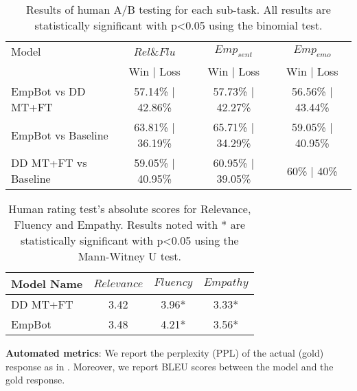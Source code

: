 \documentclass[11pt]{article}
\begin{document}
\begin{table*}[t]
\centering
\begin{tabular}{lccc}
\hline
Model &  ${Rel\&Flu}$ &  $Emp_{sent}$ & $Emp_{emo}$ \\
 &  Win | Loss & Win | Loss & Win | Loss \\
\hline
EmpBot vs DD MT+FT & 57.14\% | 42.86\%   &  57.73\% | 42.27\%  &  56.56\% | 43.44\%   \\  
EmpBot  vs Baseline & 63.81\% | 36.19\%  & 65.71\% | 34.29\%   & 59.05\% | 40.95\%   \\
DD MT+FT vs Baseline & 59.05\% | 40.95\%   &  60.95\% | 39.05\%   & 60\% | 40\%     \\
\hline
\end{tabular}
\caption{Results of human A/B testing for each sub-task. All results are statistically significant with p<0.05 using the binomial test.}
\label{tab:pairwise_dod_t5sent}
\end{table*}

\begin{table}[t]
\centering
\begin{adjustbox}{width=\columnwidth,center}
\begin{tabular}{lccc}
\hline
Model Name &  $Relevance$ & $Fluency$ & $Empathy$ \\
\hline
DD MT+FT & 3.42  &  3.96* & 3.33* \\  
EmpBot  &  3.48 & 4.21*  & 3.56* \\\hline
\end{tabular}
\end{adjustbox}
\caption{Human rating test's absolute scores for Relevance, Fluency and Empathy. Results noted with * are statistically significant with p<0.05 using the Mann-Witney U test.}
\label{tab:rating_results}
\end{table}
\noindent
\textbf{Automated metrics}: We report the perplexity (PPL) of the actual (gold) response as in \citealp{Wen_2015,li_diversity_objective_function,li_2016c_persona_conv_model}. Moreover, we  report BLEU scores \citep{papineni_2002_bleu} between the model and the gold response. 
\end{document}
